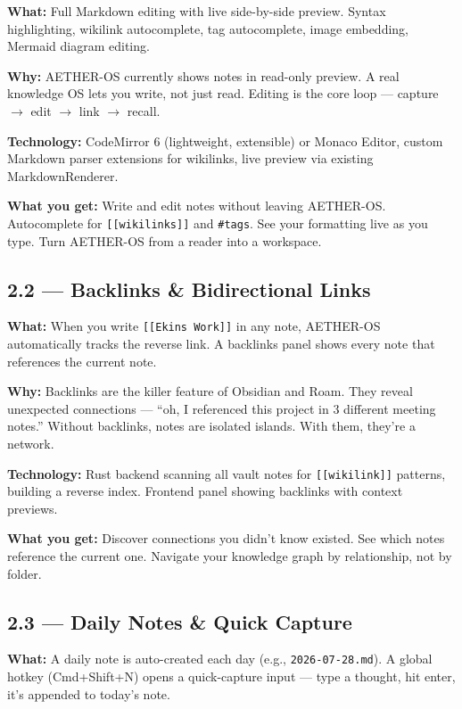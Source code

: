 \documentclass[11pt,a4paper]{article}
\begin{document}
\textbf{What:} Full Markdown editing with live side-by-side preview. Syntax highlighting, wikilink autocomplete, tag autocomplete, image embedding, Mermaid diagram editing.

\textbf{Why:} AETHER-OS currently shows notes in read-only preview. A real knowledge OS lets you write, not just read. Editing is the core loop --- capture $\rightarrow$ edit $\rightarrow$ link $\rightarrow$ recall.

\textbf{Technology:} CodeMirror 6 (lightweight, extensible) or Monaco Editor, custom Markdown parser extensions for wikilinks, live preview via existing MarkdownRenderer.

\textbf{What you get:} Write and edit notes without leaving AETHER-OS. Autocomplete for \texttt{[[wikilinks]]} and \texttt{\#tags}. See your formatting live as you type. Turn AETHER-OS from a reader into a workspace.

\subsection{2.2 --- Backlinks \& Bidirectional Links}

\textbf{What:} When you write \texttt{[[Ekins Work]]} in any note, AETHER-OS automatically tracks the reverse link. A backlinks panel shows every note that references the current note.

\textbf{Why:} Backlinks are the killer feature of Obsidian and Roam. They reveal unexpected connections --- ``oh, I referenced this project in 3 different meeting notes.'' Without backlinks, notes are isolated islands. With them, they're a network.

\textbf{Technology:} Rust backend scanning all vault notes for \texttt{[[wikilink]]} patterns, building a reverse index. Frontend panel showing backlinks with context previews.

\textbf{What you get:} Discover connections you didn't know existed. See which notes reference the current one. Navigate your knowledge graph by relationship, not by folder.

\subsection{2.3 --- Daily Notes \& Quick Capture}

\textbf{What:} A daily note is auto-created each day (e.g., \texttt{2026-07-28.md}). A global hotkey (Cmd+Shift+N) opens a quick-capture input --- type a thought, hit enter, it's appended to today's note.
\end{document}
